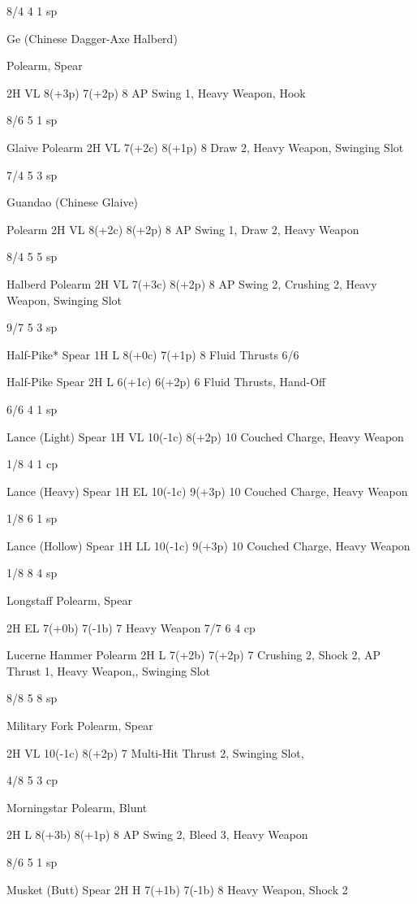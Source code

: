 \documentclass[oneside,11pt,english]{book}
\begin{document}
8/4 4 1 sp 

Ge (Chinese 
Dagger-Axe 
Halberd) 

Polearm, 
Spear 

2H VL 8(+3p) 7(+2p) 8 AP Swing 1, 
Heavy Weapon, 
Hook 

8/6 5 1 sp 

Glaive Polearm 2H VL 7(+2c) 8(+1p) 8 Draw 2, Heavy 
Weapon, Swinging 
Slot 

7/4 5 3 sp 

Guandao (Chinese 
Glaive) 

Polearm 2H VL 8(+2c) 8(+2p) 8 AP Swing 1, Draw 
2, Heavy Weapon 

8/4 5 5 sp 

Halberd Polearm 2H VL 7(+3c) 8(+2p) 8 AP Swing 2, 
Crushing 2, Heavy 
Weapon, Swinging 
Slot 

9/7 5 3 sp 

Half-Pike* Spear 1H L 8(+0c) 7(+1p) 8 Fluid Thrusts 6/6 


Half-Pike Spear 2H L 6(+1c) 6(+2p) 6 Fluid Thrusts, 
Hand-Off 

6/6 4 1 sp 

Lance (Light) Spear 1H VL 10(-1c) 8(+2p) 10 Couched Charge, 
Heavy Weapon 

1/8 4 1 cp 

Lance (Heavy) Spear 1H EL 10(-1c) 9(+3p) 10 Couched Charge, 
Heavy Weapon 

1/8 6 1 sp 

Lance (Hollow) Spear 1H LL 10(-1c) 9(+3p) 10 Couched Charge, 
Heavy Weapon 

1/8 8 4 sp 

Longstaff Polearm, 
Spear 

2H EL 7(+0b) 7(-1b) 7 Heavy Weapon 7/7 6 4 cp 

Lucerne Hammer Polearm 2H L 7(+2b) 7(+2p) 7 Crushing 2, Shock 
2, AP Thrust 1, 
Heavy Weapon,, 
Swinging Slot 

8/8 5 8 sp 

Military Fork Polearm, 
Spear 

2H VL 10(-1c) 8(+2p) 7 Multi-Hit Thrust 2, 
Swinging Slot, 

4/8 5 3 cp 

Morningstar Polearm, 
Blunt 

2H L 8(+3b) 8(+1p) 8 AP Swing 2, Bleed 
3, Heavy Weapon 

8/6 5 1 sp 

Musket (Butt) Spear 2H H 7(+1b) 7(-1b) 8 Heavy Weapon, 
Shock 2 
\end{document}
